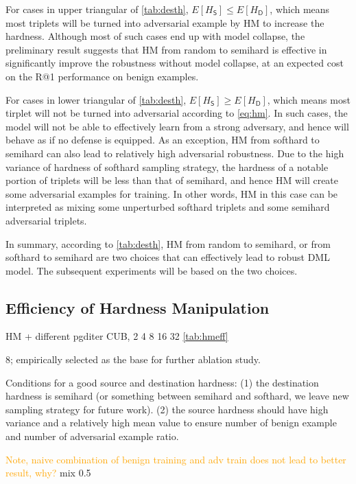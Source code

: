 \documentclass[10pt,twocolumn,letterpaper]{article}
\newcommand{\oo}[1]{\textcolor{orange}{#1}}
\begin{document}

For cases in upper triangular of \cref{tab:desth}, $E[H_\mathsf{S}] \leqslant E[H_\mathsf{D}]$,
which means most triplets will be turned into adversarial example by HM
to increase the hardness.
%
Although most of such cases end up with model collapse, the preliminary 
result suggests that HM from random to semihard is effective in significantly
improve the robustness without model collapse, at an expected cost on the R@1
performance on benign examples.

For cases in lower triangular of \cref{tab:desth}, $E[H_\mathsf{S}] \geqslant E[H_\mathsf{D}]$,
which means most tirplet will not be turned into adversarial according to
\cref{eq:hm}.
%
In such cases, the model will not be able to effectively learn from a strong
adversary, and hence will behave as if no defense is equipped.
%
As an exception, HM from softhard to semihard can also lead to relatively high
adversarial robustness.
%
Due to the high variance of hardness of softhard sampling strategy, the
hardness of a notable portion of triplets will be less than that of semihard,
and hence HM will create some adversarial examples for training.
%
In other words, HM in this case can be interpreted as mixing some unperturbed
softhard triplets and some semihard adversarial triplets.


In summary, according to \cref{tab:desth}, HM from random to semihard, or from
softhard to semihard are two choices that can effectively lead to robust
DML model.
%
The subsequent experiments will be based on the two choices.

\subsection{Efficiency of Hardness Manipulation}
\label{sec:42}

HM + different pgditer
CUB, 2 4 8 16 32
\cref{tab:hmeff}

8; empirically selected as the base for further ablation study.

Conditions for a good source and destination hardness:
%
(1) the destination hardness is semihard (or something between semihard
and softhard, we leave new sampling strategy for future work).
(2) the source hardness should have high variance and a relatively high mean
value to ensure number of benign example and number of adversarial example ratio.

\oo{Note, naive combination of benign training and adv train does not lead to better
result, why?} mix 0.5
\end{document}
